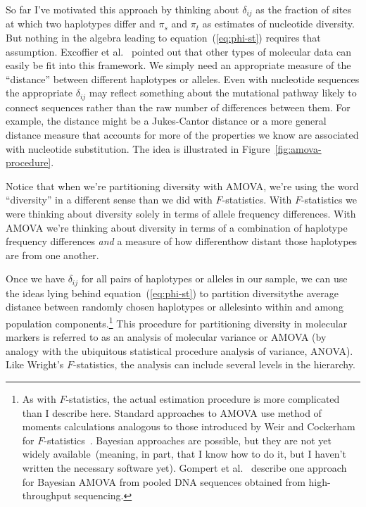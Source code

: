 \documentclass[12pt]{article}
\begin{document}
So far I've motivated this approach by thinking about $\delta_{ij}$ as
the fraction of sites at which two haplotypes differ and $\pi_s$ and
$\pi_t$ as estimates of nucleotide diversity. But nothing in the
algebra leading to equation~(\ref{eq:phi-st}) requires that
assumption. Excoffier et al.~\cite{Excoffier-etal92} pointed out that
other types of molecular data can easily be fit into this
framework. We simply need an appropriate measure of the ``distance''
between different haplotypes or alleles. Even with nucleotide
sequences the appropriate $\delta_{ij}$ may reflect something about
the mutational pathway likely to connect sequences rather than the raw
number of differences between them. For example, the distance might be
a Jukes-Cantor distance or a more general distance measure that
accounts for more of the properties we know are associated with
nucleotide substitution. The idea is illustrated in
Figure~\ref{fig:amova-procedure}.

Notice that when we're partitioning diversity with AMOVA, we're using
the word ``diversity'' in a different sense than we did with
$F$-statistics. With $F$-statistics we were thinking about diversity
solely in terms of allele frequency differences. With AMOVA we're
thinking about diversity in terms of a combination of haplotype
frequency differences {\it and\/} a measure of how different{\dash}how
distant{\dash} those haplotypes are from one another.

Once we have $\delta_{ij}$ for all pairs of haplotypes or alleles in
our sample, we can use the ideas lying behind
equation~(\ref{eq:phi-st}) to partition diversity{\dash}the average
distance between randomly chosen haplotypes or alleles{\dash}into
within and among population components.\footnote{As with
  $F$-statistics, the actual estimation procedure is more complicated
  than I describe here. Standard approaches to AMOVA use method of
  moments calculations analogous to those introduced by Weir and
  Cockerham for $F$-statistics~\cite{WeirCockerham84}. Bayesian
  approaches are possible, but they are not yet widely
  available~(meaning, in part, that I know how to do it, but I haven't
  written the necessary software yet). Gompert et
  al.~\cite{Gompert-etal-2010} describe one approach for Bayesian
  AMOVA from pooled DNA sequences obtained from high-throughput
  sequencing.} This procedure for partitioning diversity in molecular
markers is referred to as an analysis of molecular variance or AMOVA
(by analogy with the ubiquitous statistical procedure analysis of
variance, ANOVA). Like Wright's $F$-statistics, the analysis can
include several levels in the hierarchy.
\end{document}
